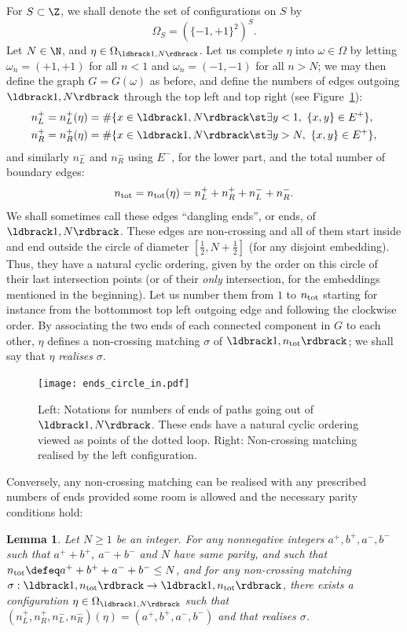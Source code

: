 \documentclass[12pt]{amsart}
\newtheorem{lemma}{Lemma}
\theoremstyle{remark}
\newcommand{\Li}{\ldbrack} %
\newcommand{\Ri}{\rdbrack}
\begin{document}
\newcommand{\ntot}{n_{\rm tot}}
For $S\subset\Z$, we shall denote the set of configurations on $S$ by
\begin{equation}\label{def_omegaS}
\Omega_S=(\{-1,+1\}^2)^S.
\end{equation}
Let $N\in\N$, and $\eta\in\Omega_{\Li1,N\Ri}$. Let us complete $\eta$ into $\omega\in\Omega$ by letting $\omega_n=(+1,+1)$ for all $n<1$ and $\omega_n=(-1,-1)$ for all $n>N$; we may then define the graph $G=G(\omega)$ as before, and define the numbers of edges outgoing $\Li1,N\Ri$ through the top left and top right (see Figure~\ref{fig:ends_circle_in}):
\begin{align*}
n^+_L = n^+_L(\eta) & =\#\{x\in\Li1,N\Ri\st \exists y<1,\ \{x,y\}\in E^+\},\\
n^+_R = n^+_R(\eta) & =\#\{x\in\Li1,N\Ri\st \exists y>N,\ \{x,y\}\in E^+\},
\end{align*}
and similarly $n^-_L$ and $n^-_R$ using $E^-$, for the lower part, and the total number of boundary edges:
\[\ntot=\ntot(\eta)=n^+_L+n^+_R+n^-_L+n^-_R.\] 
We shall sometimes call these edges ``dangling ends'', or ends, of $\Li1,N\Ri$. These edges are non-crossing and all of them start inside and end outside the circle of diameter $[\frac12,N+\frac12]$ (for any disjoint embedding). Thus, they have a natural cyclic ordering, given by the order on this circle of their last intersection points (or of their \emph{only} intersection, for the embeddings mentioned in the beginning). Let us number them from $1$ to $\ntot$ starting for instance from the bottommost top left outgoing edge and following the clockwise order. By associating the two ends of each connected component in $G$ to each other, $\eta$ defines a non-crossing matching $\sigma$ of $\Li1,\ntot\Ri$; we shall say that $\eta$ \emph{realises} $\sigma$.  
\begin{figure}
\texttt{[image: ends\_circle\_in.pdf]}
\caption{Left: Notations for numbers of ends of paths going out of $\Li1,N\Ri$. These ends have a natural cyclic ordering viewed as points of the dotted loop. Right: Non-crossing matching realised by the left configuration.}
\label{fig:ends_circle_in}
\end{figure}



Conversely, any non-crossing matching can be realised with any prescribed numbers of ends provided some room is allowed and the necessary parity conditions hold: 

\begin{lemma}\label{lem:local_config}
Let $N\ge1$ be an integer. For any nonnegative integers $a^+,b^+,a^-,b^-$ such that $a^++b^+$, $a^-+b^-$ and $N$ have same parity, and such that $\ntot\defeq a^++b^++a^-+b^-\le N$, and for any non-crossing matching $\sigma:\Li1,\ntot\Ri\to\Li1,\ntot\Ri$, there exists a configuration $\eta\in\Omega_{\Li 1,N\Ri}$ such that $(n^+_L,n^+_R,n^-_L,n^-_R)(\eta)=(a^+,b^+,a^-,b^-)$ and that realises $\sigma$. 
\end{lemma}
\end{document}
